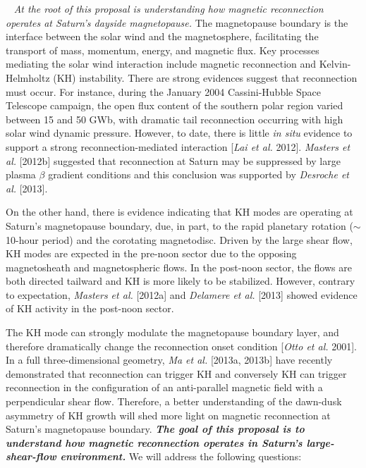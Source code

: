 \documentclass[indentfirst,12pt,letterpaper]{article}
\begin{document}
~ {\em At the root of this proposal is understanding how magnetic reconnection operates at Saturn's dayside magnetopause.}
  The magnetopause boundary is the interface between the solar wind and the magnetosphere, 
  facilitating the transport of mass, momentum, energy, and magnetic flux.  
  Key processes mediating the solar wind interaction include magnetic reconnection and Kelvin-Helmholtz (KH) instability.  
  There are strong evidences suggest that  reconnection must occur.
  For instance, during the January 2004 Cassini-Hubble Space Telescope campaign, 
  the open flux content of the southern polar region varied between 15 and 50 GWb, 
  with dramatic tail reconnection occurring with high solar wind dynamic pressure.
   However, to date, there is little {\em in situ} evidence to support a strong reconnection-mediated interaction [\emph{Lai et al.} 2012].
    \emph{Masters et al.} [2012b] suggested that reconnection at Saturn may be suppressed by large plasma $\beta$
 gradient conditions and this conclusion was supported by \emph{Desroche et al.} [2013].
  
  
 On the other hand, 
 there is evidence indicating that KH modes are operating at Saturn's magnetopause boundary, 
 due, in part, to the rapid planetary rotation ($\sim$10-hour period) and the corotating magnetodisc. 
 Driven by the large shear flow, 
 KH modes are expected in the pre-noon sector due to the opposing magnetosheath and magnetospheric flows.
 In the post-noon sector, the flows are both directed tailward and KH is more likely to be stabilized. 
 However, contrary to expectation, 
\emph{Masters et al.} [2012a] and \emph{Delamere et al.} [2013] showed evidence of KH activity in the post-noon sector.

 The KH mode can strongly modulate the magnetopause boundary layer,
 and therefore dramatically change the reconnection onset condition [\emph{Otto et al.} 2001].
In a full three-dimensional geometry, {\emph{Ma et al.}} [2013a, 2013b] have recently demonstrated that
reconnection can trigger KH and conversely KH can trigger reconnection
in the configuration of an anti-parallel magnetic field with a perpendicular shear flow. 
Therefore, a better understanding of the dawn-dusk asymmetry of KH growth will shed more light on magnetic reconnection at Saturn's magnetopause boundary.
  {\bf \em  The goal of this proposal is to understand how
  magnetic reconnection operates in Saturn's  large-shear-flow environment.}  We will address the
 following questions:
\end{document}
